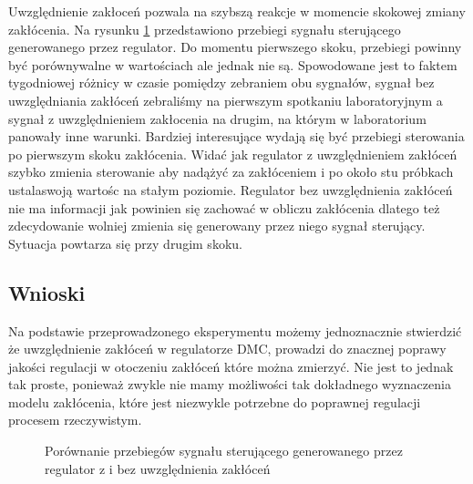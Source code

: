 Uwzględnienie zakłoceń pozwala na szybszą reakcje w momencie skokowej zmiany zakłócenia. Na rysunku \ref{lab5_porownanie_u}
przedstawiono przebiegi sygnału sterującego generowanego przez regulator. Do momentu pierwszego skoku,
przebiegi powinny być porównywalne w wartościach ale jednak nie są. Spowodowane jest to faktem tygodniowej różnicy
w czasie pomiędzy zebraniem obu sygnałów, sygnał bez uwzględniania zakłóceń zebraliśmy na pierwszym spotkaniu 
laboratoryjnym a sygnał z uwzględnieniem zakłocenia na drugim, na którym w laboratorium panowały inne warunki.
Bardziej interesujące wydają się być przebiegi sterowania po pierwszym skoku zakłócenia. Widać jak regulator
z uwzględnieniem zakłóceń szybko zmienia sterowanie aby nadążyć za zakłóceniem i po około stu próbkach
ustalaswoją wartośc na stałym poziomie. Regulator bez uwzględnienia zakłóceń nie ma informacji jak powinien
się zachować w obliczu zakłócenia dlatego też zdecydowanie wolniej zmienia się generowany przez niego sygnał
sterujący. Sytuacja powtarza się przy drugim skoku.

\subsection{Wnioski}
\label{lab5_wnioski}
Na podstawie przeprowadzonego eksperymentu możemy jednoznacznie stwierdzić że uwzględnienie zakłóceń w regulatorze DMC,
prowadzi do znacznej poprawy jakości regulacji w otoczeniu zakłóceń które można zmierzyć. Nie jest to jednak tak proste,
ponieważ zwykle nie mamy możliwości tak dokładnego wyznaczenia modelu zakłócenia, które jest niezwykle potrzebne do 
poprawnej regulacji procesem rzeczywistym.

\begin{figure}[b]    
    \centering
    \caption{Porównanie przebiegów sygnału sterującego generowanego przez regulator z i bez uwzględnienia zakłóceń}
    \label{lab5_porownanie_u}
\end{figure}
